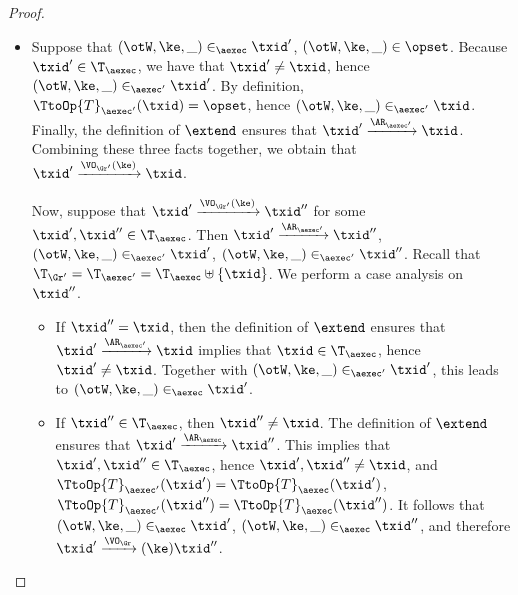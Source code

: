\begin{proof}
\begin{enumerate}
\begin{itemize}
\item Suppose that $(\otW, \ke, \_) \in_{\aexec} \txid'$, $(\otW, \ke, \_) \in \opset$. Because $\txid' \in \T_{\aexec}$, 
we have that $\txid' \neq \txid$, hence $(\otW, \ke, \_) \in_{\aexec' }\txid'$. By definition, 
$\TtoOp{T}_{\aexec'}(\txid) = \opset$, hence $(\otW, \ke, \_) \in_{\aexec'} \txid$. Finally, 
the definition of $\extend$ ensures that $\txid' \xrightarrow{\AR_{\aexec'}} \txid$. Combining 
these three facts together, we obtain that  
$\txid' \xrightarrow{\VO_{\Gr'}(\ke)} \txid$. 

Now, suppose that $\txid' \xrightarrow{\VO_{\Gr'}(\ke)} \txid''$ for some $\txid', \txid'' \in \T_{\aexec}$. 
Then $\txid' \xrightarrow{\AR_{\aexec'}} \txid''$, $(\otW, \ke, \_) \in_{\aexec'} \txid'$, $(\otW, \ke, \_) 
\in_{\aexec'} \txid''$. 
Recall that $\T_{\Gr'} = \T_{\aexec'} = \T_{\aexec} \uplus \{ \txid \}$. We perform a case analysis on $\txid''$. 

\begin{itemize}

\item If $\txid'' = \txid$, then the definition of $\extend$ ensures that $\txid' \xrightarrow{\AR_{\aexec'}} \txid$ 
implies that $\txid \in \T_{\aexec}$, hence $\txid' \neq \txid$. 
Together with $(\otW, \ke, \_) \in_{\aexec'} 
\txid'$, this leads to $(\otW, \ke, \_) \in_{\aexec} \txid'$. 

\item If $\txid'' \in \T_{\aexec}$, then $\txid'' \neq \txid$. The definition of $\extend$ ensures that $\txid' \xrightarrow{\AR_{\aexec}} \txid''$. 
This implies that $\txid', \txid'' \in \T_{\aexec}$, hence $\txid', \txid'' \neq \txid$, and $\TtoOp{T}_{\aexec'}(\txid') = \TtoOp{T}_{\aexec}(\txid')$, 
$\TtoOp{T}_{\aexec'}(\txid'') = \TtoOp{T}_{\aexec}(\txid'')$. It follows that $(\otW, \ke, \_) \in_{\aexec} \txid'$, 
$(\otW, \ke, \_) \in_{\aexec} \txid''$, and therefore $\txid' \xrightarrow{\VO_{\Gr}}(\ke) \txid''$.

\end{itemize}
\end{itemize}
\end{enumerate}
\end{proof}


